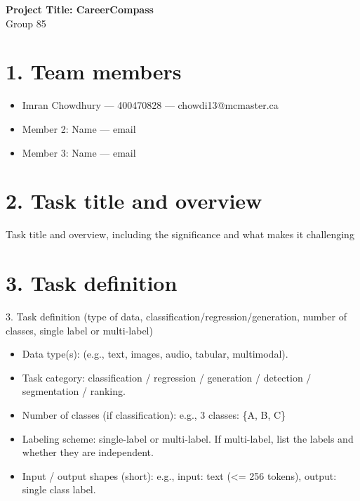 \documentclass[12pt]{article}
\begin{document}
\begin{center}
  {\Large\bfseries Project Title: CareerCompass}\\[8pt]
  {\normalsize Group 85}
\end{center}

\section*{1. Team members}
\begin{itemize}
  \item Imran Chowdhury — 400470828 — chowdi13@mcmaster.ca
  \item Member 2: Name  — email
  \item Member 3: Name  — email
\end{itemize}

\section*{2. Task title and overview}
Task title and overview, including the significance and what makes it challenging 

\section*{3. Task definition}
3. Task definition (type of data, classification/regression/generation, number of classes, single label or multi-label) 
\begin{itemize}
  \item Data type(s): (e.g., text, images, audio, tabular, multimodal).
  \item Task category: classification / regression / generation / detection / segmentation / ranking.
  \item Number of classes (if classification): e.g., 3 classes: \{A, B, C\}
  \item Labeling scheme: single-label or multi-label. If multi-label, list the labels and whether they are independent.
  \item Input / output shapes (short): e.g., input: text (<= 256 tokens), output: single class label.
\end{itemize}
\end{document}
